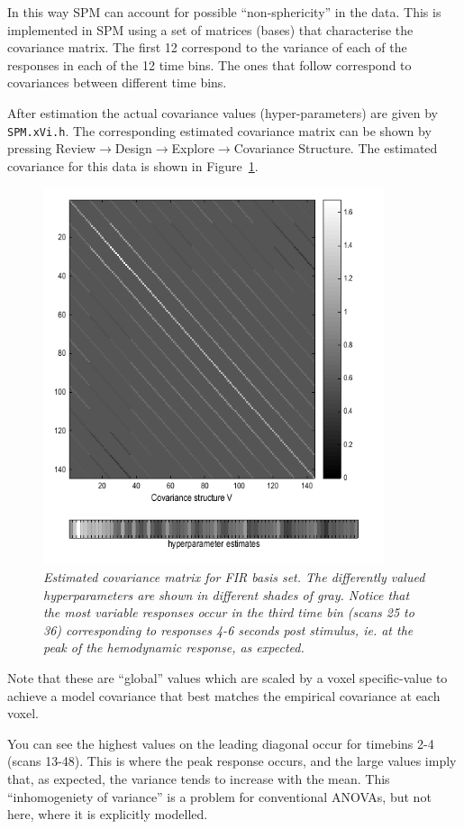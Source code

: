 In this way SPM can account for possible ``non-sphericity'' in the data. This is implemented in SPM using a set of matrices (bases) that characterise the covariance matrix. The first 12 correspond to the variance of each of the responses in each of the 12 time bins. The ones that follow  correspond to covariances between different time bins.

After estimation the actual covariance values (hyper-parameters) are given by \texttt{SPM.xVi.h}. The corresponding estimated covariance matrix can be shown by pressing Review$\rightarrow$Design$\rightarrow$Explore$\rightarrow$Covariance Structure. The estimated covariance for this data is shown in Figure~\ref{fir_covariance}.
\begin{figure}
\begin{center}
\includegraphics[width=100mm]{faces_group/fir_covariance}
\caption{\em Estimated covariance matrix for FIR basis set. The differently valued hyperparameters are shown in different shades of gray. Notice that the most variable responses occur in the third time bin (scans 25 to 36) corresponding to responses 4-6 seconds post stimulus, ie. at the peak of the hemodynamic response, as expected. \label{fir_covariance}}
\end{center}
\end{figure}
Note that these are ``global'' values which are scaled by a voxel specific-value to achieve a model covariance that best matches the empirical covariance at each voxel. 

You can see the highest values on the leading diagonal occur for timebins 2-4 (scans 13-48). This is where the peak response occurs, and the large values imply that, as expected, the variance tends to increase with the mean. This ``inhomogeniety of variance'' is a problem for conventional ANOVAs, but not here, where it is explicitly modelled.

